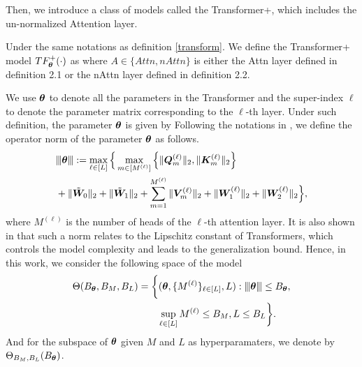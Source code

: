 Then, we introduce a class of models called the Transformer+, which includes the un-normalized Attention layer.
\begin{definition}[Transformer+]
    Under the same notations as definition \ref{transform}. We define the Transformer+ model $TF_{\boldsymbol{\theta}}^+(\cdot)$ as
    where $A\in\{Attn,nAttn\}$ is either the Attn layer defined in definition 2.1 or the nAttn layer defined in definition 2.2.
\end{definition}

We use $\boldsymbol{\theta}$ to denote all the parameters in the Transformer and the super-index $\ell$ to denote the parameter matrix corresponding to the $\ell$-th layer.
    Under such definition, the parameter $\boldsymbol{\theta}$ is given by 
Following the notations in \citep{bai2024transformers}, we define the operator norm of the parameter $\boldsymbol{\theta}$ as follows.
    \begin{align*}
&{\left\vert\kern-0.25ex\left\vert\kern-0.25ex\left\vert \boldsymbol{\theta} \right\vert\kern-0.25ex\right\vert\kern-0.25ex\right\vert}:=\max_{\ell\in[L]}\Big\{\max_{m\in[M^{(\ell)}]}\left\{\Vert \boldsymbol{Q}_m^{(\ell)}\Vert_2,\Vert\boldsymbol{K}_m^{(\ell)}\Vert_2\right\}\\
&+\Vert\tilde{\boldsymbol{W}}_0\Vert_2+\Vert\tilde{\boldsymbol{W}}_1\Vert_2+\sum_{m=1}^{M^{(\ell)}}\Vert\boldsymbol{V}_m^{(\ell)}\Vert_2+\Vert\boldsymbol{W}_1^{(\ell)}\Vert_2+\Vert\boldsymbol{W}_2^{(\ell)}\Vert_2\Big\}, 
    \end{align*}
    where $M^{(\ell)}$ is the number of heads of the $\ell$-th attention layer.
    It is also shown in \citep{bai2024transformers} that such a norm relates to the Lipschitz constant of Transformers, which controls the model complexity and leads to the generalization bound. Hence, in this work, we consider the following space of the model
    \begin{align*}
        \Theta(B_{\boldsymbol{\theta}},B_{M},B_L) &= \bigg\{(\boldsymbol{\theta}, \{M^{(\ell)}\}_{\ell\in[L]}, L): {\left\vert\kern-0.25ex\left\vert\kern-0.25ex\left\vert \boldsymbol{\theta} \right\vert\kern-0.25ex\right\vert\kern-0.25ex\right\vert}\leq B_{\boldsymbol{\theta}},\\
        &\quad\quad  \sup_{\ell\in[L]}M^{(\ell)}\leq B_{M}, L\leq B_L \bigg\}.
    \end{align*}
    And for the subspace of $\boldsymbol{\theta}$ given $M$ and $L$ as hyperparamaters, we denote by
    $\Theta_{B_M,B_L}(B_{\boldsymbol{\theta}})$.
    

